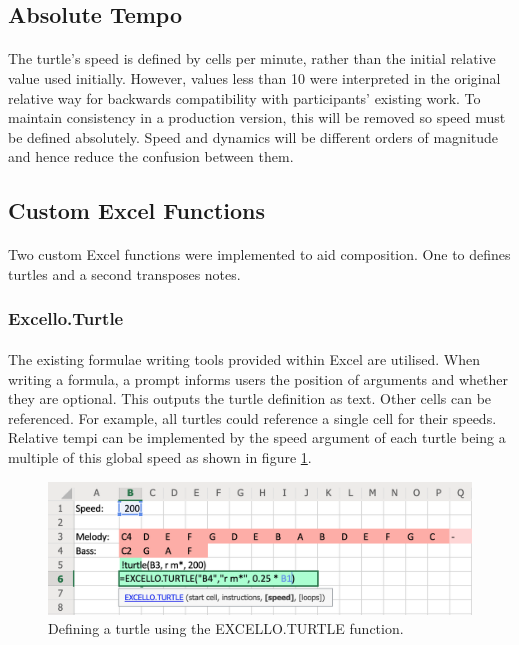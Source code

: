 \subsection{Absolute Tempo}

\paragraph{} The turtle's speed is defined by cells per minute, rather than the initial relative value used initially. However, values less than 10 were interpreted in the original relative way for backwards compatibility with participants' existing work. To maintain consistency in a production version, this will be removed so speed must be defined absolutely. Speed and dynamics will be different orders of magnitude and hence reduce the confusion between them.

\subsection{Custom Excel Functions}

\paragraph{} Two custom Excel functions were implemented to aid composition. One to defines turtles and a second transposes notes.

\subsubsection{Excello.Turtle}

\paragraph{} The existing formulae writing tools provided within Excel are utilised. When writing a formula, a prompt informs users the position of arguments and whether they are optional. This outputs the turtle definition as text. Other cells can be referenced. For example, all turtles could reference a single cell for their speeds. Relative tempi can be implemented by the speed argument of each turtle being a multiple of this global speed as shown in figure \ref{implementation:turtleFunction}.

\begin{figure}[tbh]
\centerline{\includegraphics[width=150mm]{figs/turtleFunction.png}}
\caption{Defining a turtle using the EXCELLO.TURTLE function.}
\label{implementation:turtleFunction}
\end{figure}

